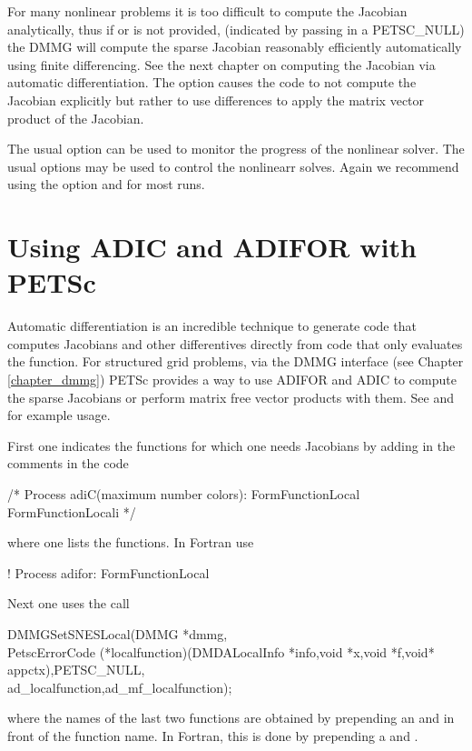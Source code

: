 For many nonlinear problems it is too difficult to compute the
Jacobian analytically, thus if  or  is not
provided, (indicated by passing in a PETSC_NULL) the DMMG will compute the
sparse Jacobian reasonably efficiently automatically using finite
differencing. See the next chapter on computing the Jacobian via
automatic differentiation. The option 
causes the code to not compute the Jacobian explicitly but rather to
use differences to apply the matrix vector product of the Jacobian.

The usual option   can
be used to monitor the progress of the nonlinear solver. The usual  options
may be used to control the nonlinearr solves. Again we recommend using the 
option  and  for most runs.


\cleardoublepage
\chapter{Using ADIC and ADIFOR with PETSc}

Automatic differentiation is an incredible technique to generate code
that computes Jacobians and other differentives directly from code
that only evaluates the function. For structured grid problems, via
the DMMG interface (see Chapter \ref{chapter_dmmg}) PETSc provides a way to use
ADIFOR and ADIC to compute the sparse Jacobians or perform matrix free
vector products with them. See
 and  for example
usage. 

First one indicates the functions for which one needs Jacobians by adding
in the comments in the code 
\begin{tabbing}
       /* Process adiC(maximum number colors): FormFunctionLocal FormFunctionLocali */
\end{tabbing}
where one lists the functions. In Fortran use
\begin{tabbing}
!     Process adifor: FormFunctionLocal
\end{tabbing}
Next one uses the call
\begin{tabbing}
  DMMGSetSNESLocal(DMMG *dmmg,\\
   PetscErrorCode (*localfunction)(DMDALocalInfo *info,void *x,void *f,void* appctx),PETSC_NULL,\\
  ad\_localfunction,ad\_mf\_localfunction);
\end{tabbing}
where the names of the last two functions are obtained 
by prepending an  and  in front
of the function name. In Fortran, this is done by prepending a  and .

